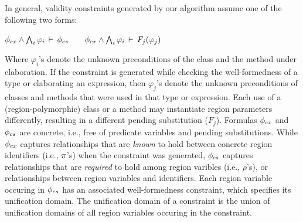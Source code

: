 In general, validity constraints generated by our algorithm assume one
of the following two forms:
\begin{center}
\( \phi_{cx} \wedge \bigwedge_{i}\varphi_i\,\vdash\,\phi_{cs} \qquad
   \phi_{cx} \wedge \bigwedge_{i}\varphi_i\,\vdash\,F_j(\varphi_j)
\)
\end{center}
Where $\varphi_i$'s denote the unknown preconditions of the class and
the method under elaboration. If the constraint is generated while
checking the well-formedness of a type or elaborating an expression,
then $\varphi_j$'s denote the unknown preconditions of classes and
methods that were used in that type or expression.  Each use of a
(region-polymorphic) class or a method may instantiate region
parameters differently, resulting in a different pending substitution
($F_j$). Formulas $\phi_{cx}$ and $\phi_{cs}$ are concrete, i.e., free
of predicate variables and pending substitutions. While $\phi_{cx}$
captures relationships that are \emph{known} to hold between concrete
region identifiers (i.e., $\pi$'s) when the constraint was generated,
$\phi_{cs}$ captures relationships that are \emph{required} to hold
among region varibles (i.e., $\rho$'s), or relationships between
region variables and identifiers. Each region variable occuring in
$\phi_{cs}$ has an associated well-formedness constraint, which
specifies its unification domain. The unification domain of a
constraint is the union of unification domains of all region variables
occuring in the constraint.

